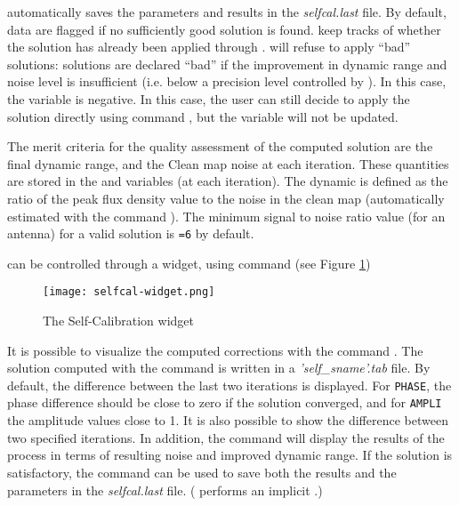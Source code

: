  automatically saves the parameters and results in 
the \textit{selfcal.last} file. By default, data are flagged if no 
sufficiently good solution is found.  keep tracks 
of whether the solution has already been applied through 
.  will refuse to apply 
``bad'' solutions: solutions are declared ``bad'' if the improvement in 
dynamic range and noise level is insufficient (i.e. below a precision 
level controlled by ). In this case, the 
 variable is negative. In this case, the user can 
still decide to apply the solution directly using command , 
but the  variable will not be updated.

The merit criteria for the quality assessment of the computed solution 
are the final dynamic range, and the Clean map noise at each iteration. 
These quantities are stored in the  and 
 variables (at each iteration). The dynamic is 
defined as the ratio of the peak flux density value to the noise in the 
clean map (automatically estimated with the command ). 
The  minimum signal to noise ratio value (for an antenna) for a valid 
solution is \texttt{=6} by default. 

 can be controlled through a widget, using
command  (see Figure \ref{fig:selfcal}) 

\begin{figure}
  \centering
  \texttt{[image: selfcal-widget.png]}
  \caption{The Self-Calibration widget
\label{fig:selfcal}}
\end{figure}



It is possible to visualize the computed corrections with the command 
. The solution computed with the  
command is written in a \textit{'self\_sname'.tab} file. By default, 
the difference between the last two iterations is displayed. For 
\texttt{PHASE}, the phase difference should be close to zero if the 
solution converged, and for \texttt{AMPLI} the amplitude values close 
to 1. It is also possible to show the difference between two specified 
iterations. In addition, the command  will 
display the results of the process in terms of resulting noise and 
improved dynamic range. If the solution is satisfactory, the command 
 can be used to save both the results and the 
parameters in the \textit{selfcal.last} file. ( 
performs an implicit .)

